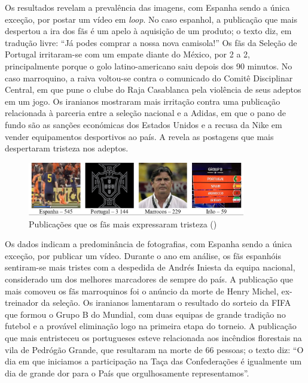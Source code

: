 \documentclass{textolivre}
\begin{document}
Os resultados revelam a prevalência das imagens, com Espanha sendo a única exceção, por postar um vídeo em \emph{loop}. No caso espanhol, a publicação que mais despertou a ira dos fãs é um apelo à aquisição de um produto; o texto diz, em tradução livre: “Já podes comprar a nossa nova camisola!” Os fãs da Seleção de Portugal irritaram-se com um empate diante do México, por 2 a 2, principalmente porque o golo latino-americano saiu depois dos 90 minutos. No caso marroquino, a raiva voltou-se contra o comunicado do Comitê Disciplinar Central, em que pune o clube do Raja Casablanca pela violência de seus adeptos em um jogo. Os iranianos mostraram mais irritação contra uma publicação relacionada à parceria entre a seleção nacional e a Adidas, em que o pano de fundo são as sanções económicas dos Estados Unidos e a recusa da Nike em vender equipamentos desportivos ao país. A  revela as postagens que mais despertaram tristeza nos adeptos.

\begin{figure}[htbp]
 \centering
 \includegraphics[width=0.85\textwidth]{figure07.png}
 \caption{Publicações que os fãs mais expressaram tristeza ({})}
 \label{fig7}
\end{figure}

Os dados indicam a predominância de fotografias, com Espanha sendo a única exceção, por publicar um vídeo. Durante o ano em análise, os fãs espanhóis sentiram-se mais tristes com a despedida de Andrés Iniesta da equipa nacional, considerado um dos melhores marcadores de sempre do país. A publicação que mais comoveu os fãs marroquinos foi o anúncio da morte de Henry Michel, ex-treinador da seleção. Os iranianos lamentaram o resultado do sorteio da FIFA que formou o Grupo B do Mundial, com duas equipas de grande tradição no futebol e a provável eliminação logo na primeira etapa do torneio. A publicação que mais entristeceu os portugueses esteve relacionada aos incêndios florestais na vila de Pedrógão Grande, que resultaram na morte de 66 pessoas; o texto diz: “O dia em que iniciamos a participação na Taça das Confederações é igualmente um dia de grande dor para o País que orgulhosamente representamos”.
\end{document}

